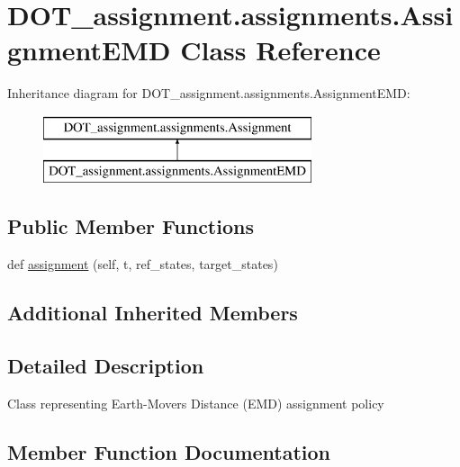 \hypertarget{class_d_o_t__assignment_1_1assignments_1_1_assignment_e_m_d}{}\section{D\+O\+T\+\_\+assignment.\+assignments.\+Assignment\+E\+MD Class Reference}
\label{class_d_o_t__assignment_1_1assignments_1_1_assignment_e_m_d}
Inheritance diagram for D\+O\+T\+\_\+assignment.\+assignments.\+Assignment\+E\+MD\+:\begin{figure}[H]
\begin{center}
\leavevmode
\includegraphics[height=2.000000cm]{class_d_o_t__assignment_1_1assignments_1_1_assignment_e_m_d}
\end{center}
\end{figure}
\subsection*{Public Member Functions}
\begin{DoxyCompactItemize}
\item 
def \mbox{\hyperlink{class_d_o_t__assignment_1_1assignments_1_1_assignment_e_m_d_a5e8a7799c8d9ad99ad33e87c8918c501}{assignment}} (self, t, ref\+\_\+states, target\+\_\+states)
\end{DoxyCompactItemize}
\subsection*{Additional Inherited Members}


\subsection{Detailed Description}
\begin{DoxyVerb}Class representing Earth-Movers Distance (EMD) assignment policy
\end{DoxyVerb}
 

\subsection{Member Function Documentation}
\mbox{\label{class_d_o_t__assignment_1_1assignments_1_1_assignment_e_m_d_a5e8a7799c8d9ad99ad33e87c8918c501}} 
